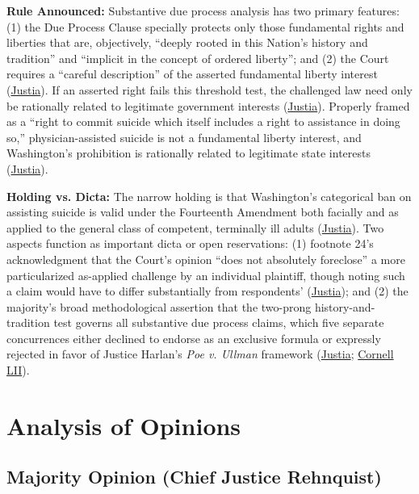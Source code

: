 \documentclass[12pt]{article}
\begin{document}
\textbf{Rule Announced:} Substantive due process analysis has two primary features: (1) the Due Process Clause specially protects only those fundamental rights and liberties that are, objectively, ``deeply rooted in this Nation's history and tradition'' and ``implicit in the concept of ordered liberty''; and (2) the Court requires a ``careful description'' of the asserted fundamental liberty interest (\href{https://supreme.justia.com/cases/federal/us/521/702/}{Justia}). If an asserted right fails this threshold test, the challenged law need only be rationally related to legitimate government interests (\href{https://supreme.justia.com/cases/federal/us/521/702/}{Justia}). Properly framed as a ``right to commit suicide which itself includes a right to assistance in doing so,'' physician-assisted suicide is not a fundamental liberty interest, and Washington's prohibition is rationally related to legitimate state interests (\href{https://supreme.justia.com/cases/federal/us/521/702/}{Justia}).

\textbf{Holding vs. Dicta:} The narrow holding is that Washington's categorical ban on assisting suicide is valid under the Fourteenth Amendment both facially and as applied to the general class of competent, terminally ill adults (\href{https://supreme.justia.com/cases/federal/us/521/702/}{Justia}). Two aspects function as important dicta or open reservations: (1) footnote 24's acknowledgment that the Court's opinion ``does not absolutely foreclose'' a more particularized as-applied challenge by an individual plaintiff, though noting such a claim would have to differ substantially from respondents' (\href{https://supreme.justia.com/cases/federal/us/521/702/}{Justia}); and (2) the majority's broad methodological assertion that the two-prong history-and-tradition test governs all substantive due process claims, which five separate concurrences either declined to endorse as an exclusive formula or expressly rejected in favor of Justice Harlan's \textit{Poe v. Ullman} framework (\href{https://supreme.justia.com/cases/federal/us/521/702/}{Justia}; \href{https://www.law.cornell.edu/supct/html/96-110.ZC4.html}{Cornell LII}).

\section{Analysis of Opinions}

\subsection{Majority Opinion (Chief Justice Rehnquist)}
\end{document}

